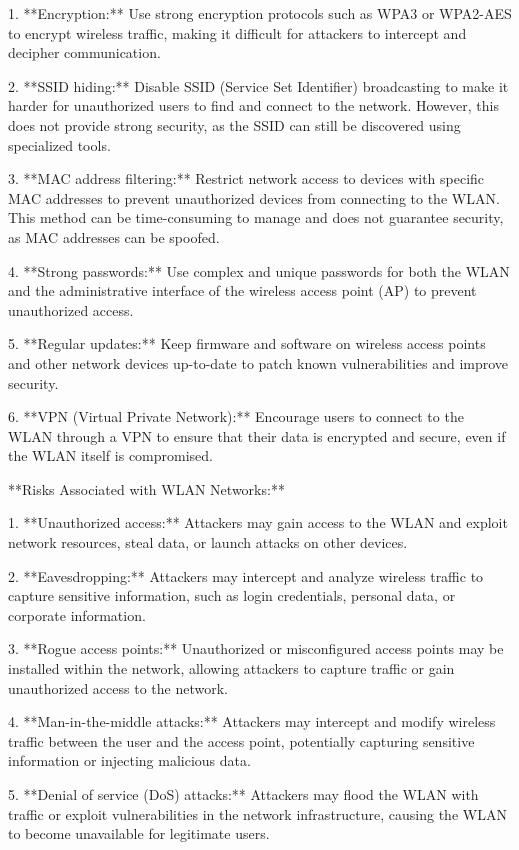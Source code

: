 \documentclass{article}
\begin{document}
1. **Encryption:** Use strong encryption protocols such as WPA3 or WPA2-AES to encrypt wireless traffic, making it difficult for attackers to intercept and decipher communication.

2. **SSID hiding:** Disable SSID (Service Set Identifier) broadcasting to make it harder for unauthorized users to find and connect to the network. However, this does not provide strong security, as the SSID can still be discovered using specialized tools.

3. **MAC address filtering:** Restrict network access to devices with specific MAC addresses to prevent unauthorized devices from connecting to the WLAN. This method can be time-consuming to manage and does not guarantee security, as MAC addresses can be spoofed.

4. **Strong passwords:** Use complex and unique passwords for both the WLAN and the administrative interface of the wireless access point (AP) to prevent unauthorized access.

5. **Regular updates:** Keep firmware and software on wireless access points and other network devices up-to-date to patch known vulnerabilities and improve security.

6. **VPN (Virtual Private Network):** Encourage users to connect to the WLAN through a VPN to ensure that their data is encrypted and secure, even if the WLAN itself is compromised.

**Risks Associated with WLAN Networks:**

1. **Unauthorized access:** Attackers may gain access to the WLAN and exploit network resources, steal data, or launch attacks on other devices.

2. **Eavesdropping:** Attackers may intercept and analyze wireless traffic to capture sensitive information, such as login credentials, personal data, or corporate information.

3. **Rogue access points:** Unauthorized or misconfigured access points may be installed within the network, allowing attackers to capture traffic or gain unauthorized access to the network.

4. **Man-in-the-middle attacks:** Attackers may intercept and modify wireless traffic between the user and the access point, potentially capturing sensitive information or injecting malicious data.

5. **Denial of service (DoS) attacks:** Attackers may flood the WLAN with traffic or exploit vulnerabilities in the network infrastructure, causing the WLAN to become unavailable for legitimate users.
\end{document}
